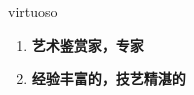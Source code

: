 
\begin{frame}
{\huge virtuoso}
\begin{center}
\begin{enumerate}\Large
  \item \textbf{艺术鉴赏家，专家}
  \item \textbf{经验丰富的，技艺精湛的}
\end{enumerate}
\end{center}
\end{frame}
